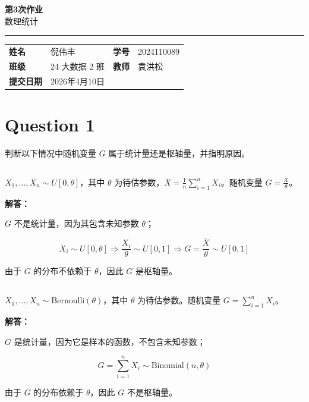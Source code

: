 \documentclass[12pt,a4paper]{article}
\newcommand{\course}{数理统计}
\newcommand{\homeworktitle}{第3次作业}
\newcommand{\studentname}{倪伟丰}
\newcommand{\studentid}{2024110089}
\newcommand{\classname}{24 大数据 2 班}
\newcommand{\teacher}{袁洪松}
\newcommand{\duedate}{2026年4月10日}
\begin{document}
\begin{center}
  {\Huge\bfseries\color{mainblue}\homeworktitle}\\[0.6em]
  {\Large\course}\\[1.2em]
  {\color{linegray}\rule{0.9\textwidth}{0.8pt}}
\end{center}

\begin{infobox}
\begin{tabularx}{\textwidth}{>{\bfseries}p{2.2cm} X >{\bfseries}p{2.2cm} X}
姓名 & \studentname & 学号 & \studentid \\
班级 & \classname & 教师 & \teacher \\
提交日期 & \duedate &  &  \\
\end{tabularx}
\end{infobox}

\section{Question 1}

判断以下情况中随机变量 $G$ 属于统计量还是枢轴量，并指明原因。

\subsection{}

$X_1,\ldots,X_n \sim U[0,\theta]$，其中 $\theta$ 为待估参数，$\bar{X} = \frac{1}{n}\sum_{i=1}^{n}X_i$。随机变量 $G = \frac{\bar{X}}{\theta}$。
    
\begin{answerbox}
\textbf{解答：}

$G$ 不是统计量，因为其包含未知参数 $\theta$；

$$
X_i \sim U[0,\theta] \Rightarrow \frac{X_i}{\theta} \sim U[0,1] \Rightarrow G = \frac{\bar{X}}{\theta}  \sim U[0,1]
$$

由于 $G$ 的分布不依赖于 $\theta$，因此 $G$ 是枢轴量。

\end{answerbox}

\subsection{}

$X_1,\ldots,X_n \sim \text{Bernoulli}(\theta)$，其中 $\theta$ 为待估参数。随机变量 $G = \sum_{i=1}^{n}X_i$。

\begin{answerbox}
\textbf{解答：}

$G$ 是统计量，因为它是样本的函数，不包含未知参数；

$$
G = \sum_{i=1}^{n}X_i \sim \text{Binomial}(n,\theta)
$$

由于 $G$ 的分布依赖于 $\theta$，因此 $G$ 不是枢轴量。
\end{answerbox}
\end{document}
